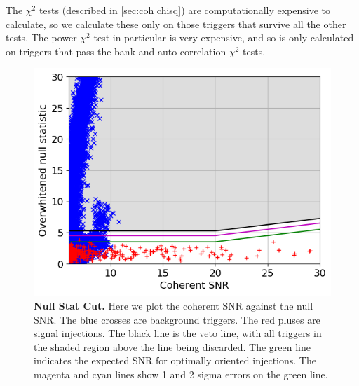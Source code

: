 \documentclass[11pt]{cuthesis}
\begin{document}
The $\chi^2$ tests (described in \ref{sec:coh chisq}) are computationally expensive to calculate, so we calculate these only on those triggers that survive all the other tests. The power $\chi^2$ test in particular is very expensive, and so is only calculated on triggers that pass the bank and auto-correlation $\chi^2$ tests.

\begin{figure} %
\begin{center}
\includegraphics[width=0.8\linewidth]{GRB170817A_null_stat2_vs_snr_zoom.png}
\end{center}
\caption{\textbf{Null Stat Cut.} Here we plot the coherent SNR against the null SNR. The blue crosses are background triggers. The red pluses are signal injections. The black line is the veto line, with all triggers in the shaded region above the line being discarded. The green line indicates the expected SNR for optimally oriented injections. The magenta and cyan lines show 1 and 2 sigma errors on the green line. }
\label{fig:nullcut}
\end{figure}
\end{document}
